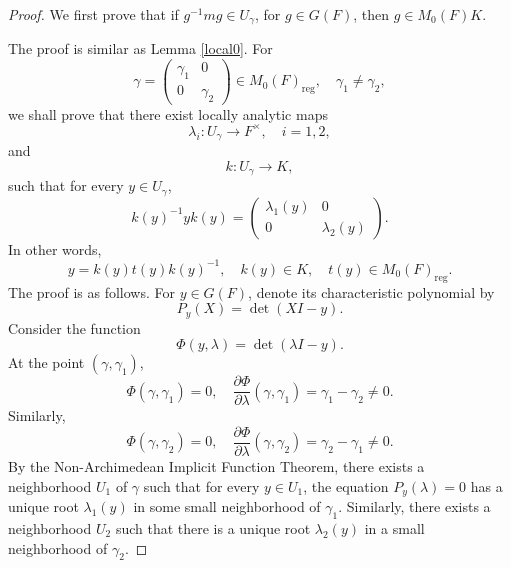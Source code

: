 \documentclass[11pt]{amsart}
\theoremstyle{definition}
\numberwithin{equation}{section}
\begin{document}
	\begin{proof}
		We first prove that if \(g^{-1}mg\in U_\gamma\), for \(g\in G(F)\), then \(g\in M_0(F)K\).
		
		The proof is similar as Lemma \ref{local0}. For
		\[
		\gamma = \begin{pmatrix} \gamma_1 & 0 \\ 0 & \gamma_2 \end{pmatrix} \in M_0(F)_{\mathrm{reg}}, \quad \gamma_1 \neq \gamma_2,
		\]we shall prove that there exist locally analytic maps
		\[
		\lambda_i : U_\gamma \longrightarrow F^\times, \quad i = 1, 2,
		\]
		and
		\[
		k : U_\gamma \longrightarrow K,
		\]
		such that for every \(y \in U_\gamma\),
		\[
		k(y)^{-1} y k(y) = \begin{pmatrix} \lambda_1(y) & 0 \\ 0 & \lambda_2(y) \end{pmatrix}.
		\]
		In other words,
		\[
		y = k(y) t(y) k(y)^{-1}, \quad k(y) \in K, \quad t(y) \in M_0(F)_{\mathrm{reg}}.
		\]
		The proof is as follows.
		For \(y \in G(F)\), denote its characteristic polynomial by
		\[
		P_y(X) = \det(XI - y).
		\]
		Consider the function
		\[
		\Phi(y, \lambda) = \det(\lambda I - y).
		\]
		At the point \((\gamma, \gamma_1)\),
		\[
		\Phi(\gamma, \gamma_1) = 0,\quad \frac{\partial \Phi}{\partial \lambda}(\gamma, \gamma_1) = \gamma_1 - \gamma_2 \neq 0.
		\]
		Similarly,
		\[
		\Phi(\gamma, \gamma_2) = 0, \quad \frac{\partial \Phi}{\partial \lambda}(\gamma, \gamma_2) = \gamma_2 - \gamma_1 \neq 0.
		\]
		By the Non-Archimedean Implicit Function Theorem, there exists a neighborhood \(U_1\) of \(\gamma\) such that for every \(y \in U_1\), the equation \(P_y(\lambda) = 0\) has a unique root \(\lambda_1(y)\) in some small neighborhood of \(\gamma_1\). Similarly, there exists a neighborhood \(U_2\) such that there is a unique root \(\lambda_2(y)\) in a small neighborhood of \(\gamma_2\).
		

\end{proof}
\end{document}
